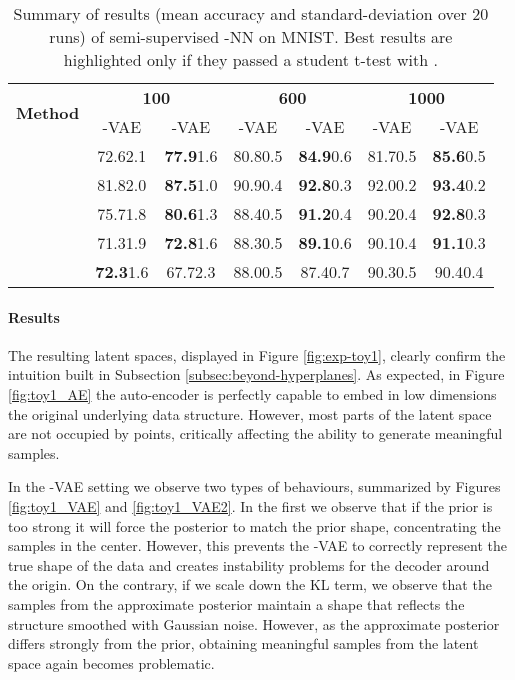 \documentclass[letterpaper]{article}
\begin{document}
\begin{table*}[!ht]
  \centering
  \caption{Summary of results (mean accuracy and standard-deviation over 20 runs) of semi-supervised -NN on MNIST. Best results are highlighted only if they passed a student t-test with .}
  \bigskip
  \begin{tabular}{l|cc|cc|cc}
    \toprule
    \multirow{2}{*}{\textbf{Method}} &
    \multicolumn{2}{c}{\textbf{100}} &
    \multicolumn{2}{c}{\textbf{600}} &
    \multicolumn{2}{c}{\textbf{1000}}
        \\
        & -VAE & -VAE & -VAE & -VAE & -VAE & -VAE \\
    \midrule
&72.6{\tiny2.1}&\textbf{77.9}{\tiny1.6}&80.8{\tiny0.5}&\textbf{84.9}{\tiny0.6}&81.7{\tiny0.5}&\textbf{85.6}{\tiny0.5}\\
&81.8{\tiny2.0}&\textbf{87.5}{\tiny1.0}&90.9{\tiny0.4}&\textbf{92.8}{\tiny0.3}&92.0{\tiny0.2}&\textbf{93.4}{\tiny0.2}\\
&75.7{\tiny1.8}&\textbf{80.6}{\tiny1.3}&88.4{\tiny0.5}&\textbf{91.2}{\tiny0.4}&90.2{\tiny0.4}&\textbf{92.8}{\tiny0.3}\\
&71.3{\tiny1.9}&\textbf{72.8}{\tiny1.6}&88.3{\tiny0.5}&\textbf{89.1}{\tiny0.6}&90.1{\tiny0.4}&\textbf{91.1}{\tiny0.3}\\
&\textbf{72.3}{\tiny1.6}&67.7{\tiny2.3}&88.0{\tiny0.5}&87.4{\tiny0.7}&90.3{\tiny0.5}&90.4{\tiny0.4}\\
    \bottomrule
    \end{tabular}
  \label{tab:m1_k5_a}
\end{table*}


\paragraph{Results}
The resulting latent spaces, displayed in Figure \ref{fig:exp-toy1}, clearly confirm the intuition built in Subsection \ref{subsec:beyond-hyperplanes}. As expected, in Figure \ref{fig:toy1_AE} the auto-encoder is perfectly capable to embed in low dimensions the original underlying data structure. However, most parts of the latent space are not occupied by points, critically affecting the ability to generate meaningful samples.

In the \Nv-VAE setting we observe two types of behaviours, summarized by Figures \ref{fig:toy1_VAE} and  \ref{fig:toy1_VAE2}. In the first we observe that if the prior is too strong it will force the posterior to match the prior shape, concentrating the samples in the center. However, this prevents the \Nv-VAE to correctly represent the true shape of the data and creates instability problems for the decoder around the origin. On the contrary, if we scale down the KL term, we observe that the samples from the approximate posterior maintain a shape that reflects the  structure smoothed with Gaussian noise. However, as the approximate posterior differs strongly from the prior, obtaining meaningful samples from the latent space again becomes problematic. 
\end{document}
